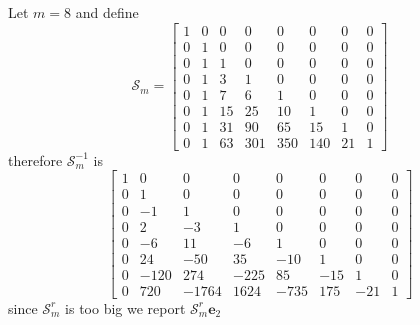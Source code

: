 Let $m=8$ and define
\begin{displaymath}
\mathcal{S}_{m} = \left[\begin{matrix}1 & 0 & 0 & 0 & 0 & 0 & 0 & 0\\0 & 1 & 0 & 0 & 0 & 0 & 0 & 0\\0 & 1 & 1 & 0 & 0 & 0 & 0 & 0\\0 & 1 & 3 & 1 & 0 & 0 & 0 & 0\\0 & 1 & 7 & 6 & 1 & 0 & 0 & 0\\0 & 1 & 15 & 25 & 10 & 1 & 0 & 0\\0 & 1 & 31 & 90 & 65 & 15 & 1 & 0\\0 & 1 & 63 & 301 & 350 & 140 & 21 & 1\end{matrix}\right]
\end{displaymath}
therefore $\mathcal{S}_{m}^{-1}$ is
\begin{displaymath}
\left[\begin{matrix}1 & 0 & 0 & 0 & 0 & 0 & 0 & 0\\0 & 1 & 0 & 0 & 0 & 0 & 0 & 0\\0 & -1 & 1 & 0 & 0 & 0 & 0 & 0\\0 & 2 & -3 & 1 & 0 & 0 & 0 & 0\\0 & -6 & 11 & -6 & 1 & 0 & 0 & 0\\0 & 24 & -50 & 35 & -10 & 1 & 0 & 0\\0 & -120 & 274 & -225 & 85 & -15 & 1 & 0\\0 & 720 & -1764 & 1624 & -735 & 175 & -21 & 1\end{matrix}\right]
\end{displaymath}
since $\mathcal{S}_{m}^{r}$ is too big we report $\mathcal{S}_{m}^{r}\textbf{e}_{2}$ 
